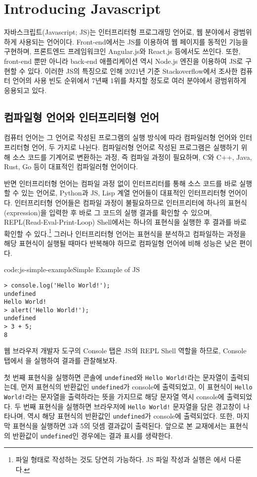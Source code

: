 \section{Introducing Javascript} \label{sect:introducing-javascript}

자바스크립트(Javascript; JS)는 인터프리터형 프로그래밍 언어로, 웹 분야에서 광범위하게 사용되는 언어이다. Front-end에서는 JS를 이용하여 웹 페이지를 동적인 기능을 구현하며, 프론트엔드 프레임워크인 Angular.js와 React.js 등에서도 쓰인다. 또한, front-end 뿐만 아니라 back-end 애플리케이션 역시 Node.js 엔진을 이용하여 JS로 구현할 수 있다. 이러한 JS의 특징으로 인해 2021년 기준 Stackoverflow에서 조사한 컴퓨터 언어의 사용 빈도 순위에서 7년째 1위를 차지할 정도로 여러 분야에서 광범위하게 응용되고 있다.

\subsection*{컴파일형 언어와 인터프리터형 언어}

컴퓨터 언어는 그 언어로 작성된 프로그램의 실행 방식에 따라 컴파일러형 언어와 인터프리터형 언어, 두 가지로 나뉜다. 컴파일러형 언어로 작성된 프로그램은 실행하기 위해 소스 코드를 기계어로 변환하는 과정, 즉 컴파일 과정이 필요하며, C와 C++, Java, Rust, Go 등이 대표적인 컴파일러형 언어이다.

반면 인터프리터형 언어는 컴파일 과정 없이 인터프리터를 통해 소스 코드를 바로 실행할 수 있는 언어로, Python과 JS, Lisp 계열 언어들이 대표적인 인터프리터형 언어이다. 인터프리터형 언어들은 컴파일 과정이 불필요하므로 인터프리터에 하나의 표현식(expression)을 입력한 후 바로 그 코드의 실행 결과를 확인할 수 있으며, REPL(Read-Eval-Print-Loop) Shell에서는 하나의 표현식을 실행한 후 결과를 바로 확인할 수 있다.\footnote{파일 형태로 작성하는 것도 당연히 가능하다. JS 파일 작성과 실행은 에서 다룬다.} 그러나 인터프리터형 언어는 표현식을 분석하고 컴파일하는 과정을 해당 표현식이 실행될 때마다 반복해야 하므로 컴파일형 언어에 비해 성능은 낮은 편이다.

\begin{codeenv}{code:js-simple-example}{Simple Example of JS}\begin{verbatim}
> console.log('Hello World!');
undefined
Hello World!
> alert('Hello World!');
undefined
> 3 + 5;
8
\end{verbatim}
\end{codeenv}

웹 브라우저 개발자 도구의 Console 탭은 JS의 REPL Shell 역할을 하므로, Console 탭에서 을 실행하여 결과를 관찰해보자.

첫 번째 표현식을 실행하면 콘솔에 \texttt{undefined}와 \texttt{Hello World!}라는 문자열이 출력되는데, 먼저 표현식의 반환값인 \texttt{undefined}가 console에 출력되었고, 이 표현식이 \texttt{Hello World!}라는 문자열을 출력하라는 뜻을 가지므로 해당 문자열 역시 console에 출력되었다. 두 번째 표현식을 실행하면 브라우저에 \texttt{Hello World!} 문자열을 담은 경고창이 나타나며, 역시 해당 표현식의 반환값인 \texttt{undefined}가 console에 출력되었다. 또한, 마지막 표현식을 실행하면 3과 5의 덧셈 결과값이 출력된다. 앞으로 본 교재에서는 표현식의 반환값이 \texttt{undefined}인 경우에는 결과 표시를 생략한다.
